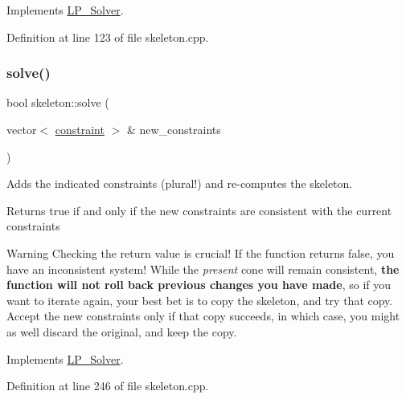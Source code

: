 Implements \hyperlink{class_l_p___solver_a442ad4ad67ee2feff0df49e9201d61ca}{L\+P\+\_\+\+Solver}.



Definition at line 123 of file skeleton.\+cpp.

\mbox{\label{classskeleton_ac366952c2b0908159255916a1e37f9b3}} 
\subsubsection{\texorpdfstring{solve()}{solve()}\hspace{0.1cm}{\footnotesize\ttfamily [1/2]}}
{\footnotesize\ttfamily bool skeleton\+::solve (\begin{DoxyParamCaption}\item[{vector$<$ \hyperlink{classconstraint}{constraint} $>$ \&}]{new\+\_\+constraints }\end{DoxyParamCaption})\hspace{0.3cm}{\ttfamily [virtual]}}



Adds the indicated constraints (plural!) and re-\/computes the skeleton. 

\begin{DoxyReturn}{Returns}
{\ttfamily true} if and only if the new constraints are consistent with the current constraints
\end{DoxyReturn}
\begin{DoxyWarning}{Warning}
Checking the return value is crucial! If the function returns {\ttfamily false}, you have an inconsistent system! While the {\itshape present} cone will remain consistent, {\bfseries the function will not roll back previous changes you have made}, so if you want to iterate again, your best bet is to copy the skeleton, and try that copy. Accept the new constraints only if that copy succeeds, in which case, you might as well discard the original, and keep the copy. 
\end{DoxyWarning}


Implements \hyperlink{class_l_p___solver_a35da4bdf5db971c445f495b6eaab072d}{L\+P\+\_\+\+Solver}.



Definition at line 246 of file skeleton.\+cpp.

\mbox{\label{classskeleton_a8add1433d3bc6b1a8588f0f88134599f}} 
